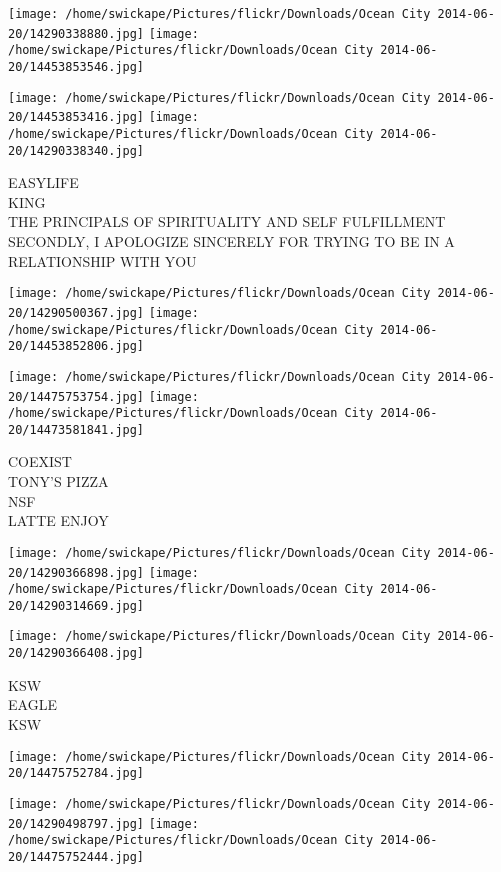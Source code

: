 \documentclass[10pt,letterpaper]{article}
\begin{document}
\texttt{[image: /home/swickape/Pictures/flickr/Downloads/Ocean City 2014-06-20/14290338880.jpg]}
\texttt{[image: /home/swickape/Pictures/flickr/Downloads/Ocean City 2014-06-20/14453853546.jpg]}

\texttt{[image: /home/swickape/Pictures/flickr/Downloads/Ocean City 2014-06-20/14453853416.jpg]}
\texttt{[image: /home/swickape/Pictures/flickr/Downloads/Ocean City 2014-06-20/14290338340.jpg]}

EASYLIFE\\
KING\\
THE PRINCIPALS OF SPIRITUALITY AND SELF FULFILLMENT\\
SECONDLY, I APOLOGIZE SINCERELY FOR TRYING TO BE IN A RELATIONSHIP WITH YOU\\
\pagebreak

\texttt{[image: /home/swickape/Pictures/flickr/Downloads/Ocean City 2014-06-20/14290500367.jpg]}
\texttt{[image: /home/swickape/Pictures/flickr/Downloads/Ocean City 2014-06-20/14453852806.jpg]}

\texttt{[image: /home/swickape/Pictures/flickr/Downloads/Ocean City 2014-06-20/14475753754.jpg]}
\texttt{[image: /home/swickape/Pictures/flickr/Downloads/Ocean City 2014-06-20/14473581841.jpg]}

COEXIST\\
TONY'S PIZZA\\
NSF\\
LATTE ENJOY\\
\pagebreak

\texttt{[image: /home/swickape/Pictures/flickr/Downloads/Ocean City 2014-06-20/14290366898.jpg]}
\texttt{[image: /home/swickape/Pictures/flickr/Downloads/Ocean City 2014-06-20/14290314669.jpg]}

\texttt{[image: /home/swickape/Pictures/flickr/Downloads/Ocean City 2014-06-20/14290366408.jpg]}

KSW\\
EAGLE\\
KSW\\
\pagebreak

\texttt{[image: /home/swickape/Pictures/flickr/Downloads/Ocean City 2014-06-20/14475752784.jpg]}

\vspace{0.25in}
\texttt{[image: /home/swickape/Pictures/flickr/Downloads/Ocean City 2014-06-20/14290498797.jpg]}
\texttt{[image: /home/swickape/Pictures/flickr/Downloads/Ocean City 2014-06-20/14475752444.jpg]}
\end{document}
